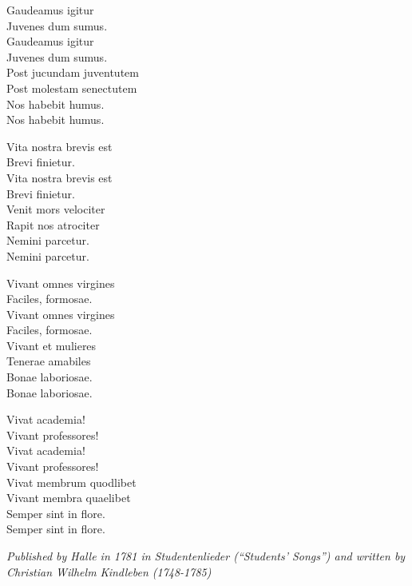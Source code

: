 \vspace{8pt}
Gaudeamus igitur\\
Juvenes dum sumus.\\
Gaudeamus igitur\\
Juvenes dum sumus.\\
Post jucundam juventutem\\
Post molestam senectutem\\
Nos habebit humus.\\
Nos habebit humus.\par
\vspace{8pt}
Vita nostra brevis est\\
Brevi finietur.\\
Vita nostra brevis est\\
Brevi finietur.\\
Venit mors velociter\\
Rapit nos atrociter\\
Nemini parcetur.\\
Nemini parcetur.\par
\newpage
Vivant omnes virgines\\
Faciles, formosae.\\
Vivant omnes virgines\\
Faciles, formosae.\\
Vivant et mulieres\\
Tenerae amabiles\\
Bonae laboriosae.\\
Bonae laboriosae.\par
\vspace{10pt}
Vivat academia!\\
Vivant professores!\\
Vivat academia!\\
Vivant professores!\\
Vivat membrum quodlibet\\
Vivant membra quaelibet\\
Semper sint in flore.\\
Semper sint in flore.\par
\vspace{10pt}
{\footnotesize\textit{Published by Halle in 1781 in Studentenlieder (``Students' Songs'') and written by Christian Wilhelm Kindleben (1748-1785)}}
